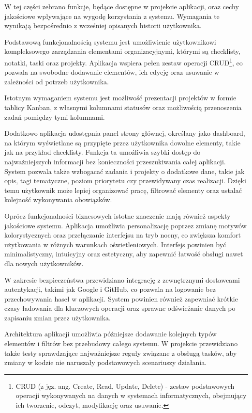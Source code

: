\documentclass[12pt,a4paper,twoside]{report}
\newcommand{\FirstParagraph}{\noindent\ignorespaces}
\begin{document}
\FirstParagraph W tej części zebrano funkcje, będące dostępne w projekcie aplikacji, oraz cechy jakościowe wpływające na wygodę korzystania z systemu. Wymagania te wynikają bezpośrednio z wcześniej opisanych historii użytkownika.

Podstawową funkcjonalnością systemu jest umożliwienie użytkownikowi kompleksowego zarządzania elementami organizacyjnymi, którymi są checklisty, notatki, taski oraz projekty. Aplikacja wspiera pełen zestaw operacji CRUD\footnote{CRUD (z jęz. ang. Create, Read, Update, Delete) - zestaw podstawowych operacji wykonywanych na danych w systemach informatycznych, obejmujący ich tworzenie, odczyt, modyfikację oraz usuwanie.}, co pozwala na swobodne dodawanie elementów, ich edycję oraz usuwanie w zależności od potrzeb użytkownika.

Istotnym wymaganiem systemu jest możliwość prezentacji projektów w formie tablicy Kanban, z własnymi kolumnami statusów oraz możliwością przenoszenia zadań pomiędzy tymi kolumnami.

Dodatkowo aplikacja udostępnia panel strony głównej, określany jako dashboard, na którym wyświetlane są przypięte przez użytkownika dowolne elementy, takie jak na przykład checklisty. Funkcja ta umożliwia szybki dostęp do najważniejszych informacji bez konieczności przeszukiwania całej aplikacji. System pozwala także wzbogacać zadania i projekty o dodatkowe dane, takie jak opis, tagi tematyczne, poziom priorytetu czy przewidywany czas realizacji. Dzięki temu użytkownik może lepiej organizować pracę, filtrować elementy oraz ustalać kolejność wykonywania obowiązków.

Oprócz funkcjonalności biznesowych istotne znaczenie mają również aspekty jakościowe systemu. Aplikacja umożliwia personalizację poprzez zmianę motywów kolorystycznych oraz przełączanie interfejsu na tryb nocny, co zwiększa komfort użytkowania w różnych warunkach oświetleniowych. Interfejs powinien być minimalistyczny, intuicyjny oraz estetyczny, aby zapewnić łatwość obsługi nawet dla nowych użytkowników.

W zakresie bezpieczeństwa przewidziano integrację z zewnętrznymi dostawcami autentykacji, takimi jak Google i GitHub, co pozwala na logowanie bez przechowywania haseł w aplikacji. System powinien również zapewniać krótkie czasy ładowania dla kluczowych operacji oraz sprawne odświeżanie danych po zapisaniu zmian przez użytkownika.

Architektura aplikacji umożliwia późniejsze dodawanie kolejnych typów elementów i filtrów bez przebudowy całego systemu. W projekcie przewidziano także testy sprawdzające najważniejsze reguły związane z obsługą tasków, aby zmiany w kodzie nie naruszały podstawowych scenariuszy działania.
\end{document}
